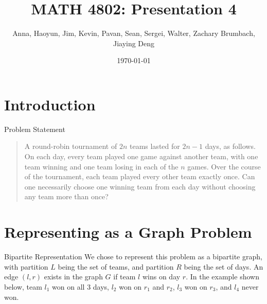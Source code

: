 \documentclass{beamer}
\institute{Georgia Tech}
\title{MATH 4802: Presentation 4}
\author{Anna, Haoyun, Jim, Kevin,
Pavan, Sean, Sergei, Walter, Zachary Brumbach, Jiaying Deng}
\date{\today}
\begin{document}
\begin{frame}
\titlepage
\end{frame}

\section{Introduction}
\begin{frame}{Problem Statement}
\begin{quote}
    A round-robin tournament of $2n$ teams lasted for $2n-1$ days, as follows. On each day, every team played one game against another team, with one team winning and one team losing in each of the $n$ games. Over the course of the tournament, each team played every other team exactly once. Can one necessarily choose one winning team from each day without choosing any team more than once?
\end{quote}
\end{frame}

\section{Representing as a Graph Problem}
\begin{frame}{Bipartite Representation}
We chose to represent this problem as a bipartite graph, with partition $L$ being the set of teams, and partition $R$ being the set of days. An edge $(l, r)$ exists in the graph $G$ if team $l$ wins on day $r$.
In the example shown below, team $l_1$ won on all 3 days, $l_2$ won on $r_1$ and $r_2$, $l_3$ won on $r_3$, and $l_4$ never won.
    \begin{center}
    \end{center}
\end{frame}
\end{document}
